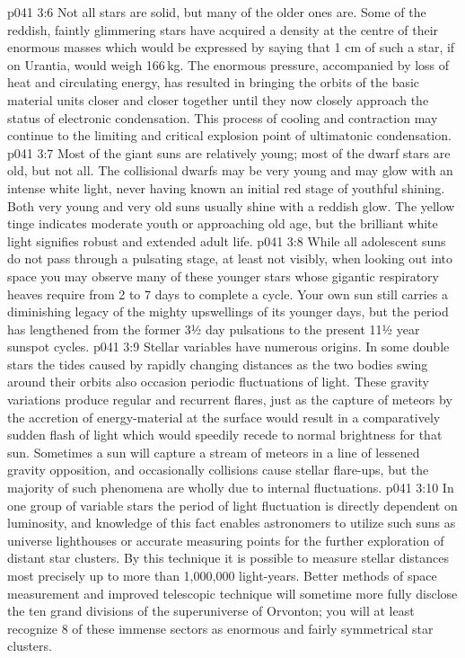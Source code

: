 \vs p041 3:6 \pc Not all stars are solid, but many of the older ones are. Some of the reddish, faintly glimmering stars have acquired a density at the centre of their enormous masses which would be expressed by saying that 1 cm of such a star, if on Urantia, would weigh 166\,kg. The enormous pressure, accompanied by loss of heat and circulating energy, has resulted in bringing the orbits of the basic material units closer and closer together until they now closely approach the status of electronic condensation. This process of cooling and contraction may continue to the limiting and critical explosion point of ultimatonic condensation.
\vs p041 3:7 Most of the giant suns are relatively young; most of the dwarf stars are old, but not all. The collisional dwarfs may be very young and may glow with an intense white light, never having known an initial red stage of youthful shining. Both very young and very old suns usually shine with a reddish glow. The yellow tinge indicates moderate youth or approaching old age, but the brilliant white light signifies robust and extended adult life.
\vs p041 3:8 \pc While all adolescent suns do not pass through a pulsating stage, at least not visibly, when looking out into space you may observe many of these younger stars whose gigantic respiratory heaves require from 2 to 7 days to complete a cycle. Your own sun still carries a diminishing legacy of the mighty upswellings of its younger days, but the period has lengthened from the former 3½ day pulsations to the present 11½ year sunspot cycles.
\vs p041 3:9 Stellar variables have numerous origins. In some double stars the tides caused by rapidly changing distances as the two bodies swing around their orbits also occasion periodic fluctuations of light. These gravity variations produce regular and recurrent flares, just as the capture of meteors by the accretion of energy\hyp{}material at the surface would result in a comparatively sudden flash of light which would speedily recede to normal brightness for that sun. Sometimes a sun will capture a stream of meteors in a line of lessened gravity opposition, and occasionally collisions cause stellar flare\hyp{}ups, but the majority of such phenomena are wholly due to internal fluctuations.
\vs p041 3:10 In one group of variable stars the period of light fluctuation is directly dependent on luminosity, and knowledge of this fact enables astronomers to utilize such suns as universe lighthouses or accurate measuring points for the further exploration of distant star clusters. By this technique it is possible to measure stellar distances most precisely up to more than 1,000,000 light\hyp{}years. Better methods of space measurement and improved telescopic technique will sometime more fully disclose the ten grand divisions of the superuniverse of Orvonton; you will at least recognize 8 of these immense sectors as enormous and fairly symmetrical star clusters.
